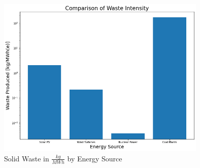 \begin{figure}[H]
\centering
\includegraphics[width = 10cm]{img/mass-waste-intensity.png}
\caption{Solid Waste in $\frac{kg}{MWh}$ by Energy Source}
\label{fig:mass-waste}
\end{figure}
